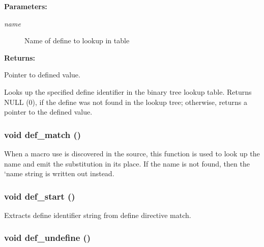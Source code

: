 \begin{Desc}
\item[{\bf Parameters: }]\par
\begin{description}
\item[
{\em name}]Name of define to lookup in table

\end{description}
\end{Desc}
\begin{Desc}
\item[{\bf Returns: }]\par
Pointer to defined value.

\end{Desc}
Looks up the specified define identifier in the binary tree lookup table. Returns NULL (0), if the define was not found in the lookup tree; otherwise, returns a pointer to the defined value. 
\subsubsection{\setlength{\rightskip}{0pt plus 5cm}void def\_\-match ()\hspace{0.3cm}{\tt  [static]}}\label{pplexer_8c_a126}


When a macro use is discovered in the source, this function is used to look up the name and emit the substitution in its place. If the name is not found, then the `name string is written out instead. 
\subsubsection{\setlength{\rightskip}{0pt plus 5cm}void def\_\-start ()\hspace{0.3cm}{\tt  [static]}}\label{pplexer_8c_a127}


Extracts define identifier string from define directive match. 
\subsubsection{\setlength{\rightskip}{0pt plus 5cm}void def\_\-undefine ()\hspace{0.3cm}{\tt  [static]}}\label{pplexer_8c_a129}


